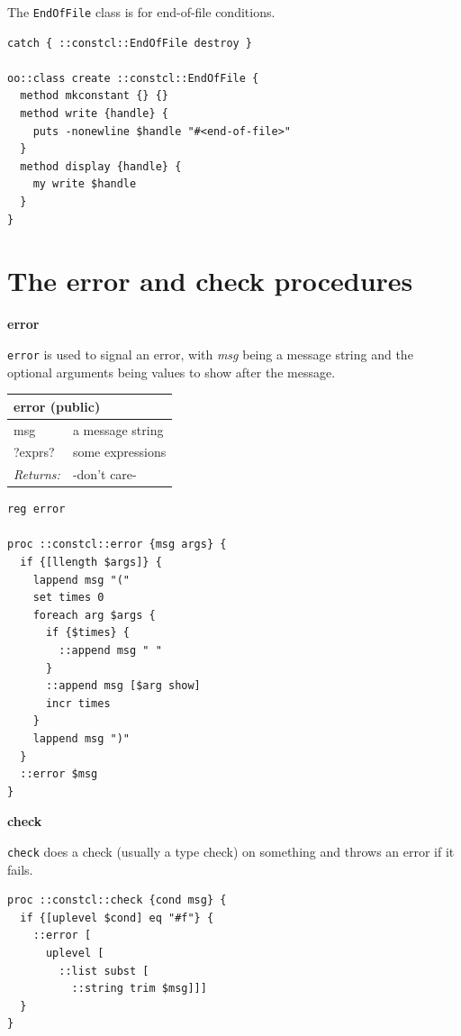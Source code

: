 \documentclass[twoside,9pt]{report}
\begin{document}
The \texttt{EndOfFile} class is for end-of-file conditions.

\noindent\makebox[\linewidth]{\rule{\linewidth}{0.4pt}}
\begin{lstlisting}
catch { ::constcl::EndOfFile destroy }
 
oo::class create ::constcl::EndOfFile {
  method mkconstant {} {}
  method write {handle} {
    puts -nonewline $handle "#<end-of-file>"
  }
  method display {handle} {
    my write $handle
  }
}
\end{lstlisting}
\noindent\makebox[\linewidth]{\rule{\linewidth}{0.4pt}}
\section{The error and check procedures}
\label{the-error-and-check-procedures}

\textbf{error}


\texttt{error} is used to signal an error, with \emph{msg} being a message string and the optional arguments being values to show after the message.

\begin{tabular}{ |l l| }
\hline
\multicolumn{2}{|l|}{error (public)} \\
\hline
msg & a message string \\
?exprs? & some expressions \\
\textit{Returns:} & -don't care- \\
\hline
\end{tabular}

\noindent\makebox[\linewidth]{\rule{\linewidth}{0.4pt}}
\begin{lstlisting}
reg error
 
proc ::constcl::error {msg args} {
  if {[llength $args]} {
    lappend msg "("
    set times 0
    foreach arg $args {
      if {$times} {
        ::append msg " "
      }
      ::append msg [$arg show]
      incr times
    }
    lappend msg ")"
  }
  ::error $msg
}
\end{lstlisting}
\noindent\makebox[\linewidth]{\rule{\linewidth}{0.4pt}}

\textbf{check}


\texttt{check} does a check (usually a type check) on something and throws an error if it fails.

\noindent\makebox[\linewidth]{\rule{\linewidth}{0.4pt}}
\begin{lstlisting}
proc ::constcl::check {cond msg} {
  if {[uplevel $cond] eq "#f"} {
    ::error [
      uplevel [
        ::list subst [
          ::string trim $msg]]]
  }
}
\end{lstlisting}
\noindent\makebox[\linewidth]{\rule{\linewidth}{0.4pt}}
\end{document}
